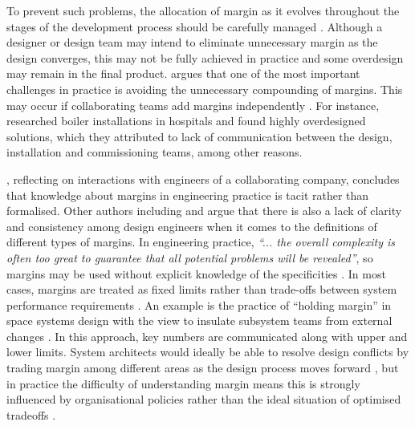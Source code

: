 To prevent such problems, the allocation of margin as it evolves throughout the stages of the development process should be carefully managed \citep{Thunnissen2004b, Eckert2019}. Although a designer or design team may intend to eliminate unnecessary margin as the design converges, this may not be fully achieved in practice and some overdesign may remain in the final product. \cite{Gale1975} argues that one of the most important challenges in practice is avoiding the unnecessary compounding of margins. This may occur if collaborating teams add margins independently \citep{Gale1975, Eckert2017}. For instance, \cite{Jones2018} researched boiler installations in hospitals and found highly overdesigned solutions, which they attributed to lack of communication between the design, installation and commissioning teams, among other reasons.

\cite{lebjioui2018}, reflecting on interactions with engineers of a collaborating company, concludes that knowledge about margins in engineering practice is tacit rather than formalised. Other authors including \cite{Gale1975} and \cite{Eckert2017} argue that there is also a lack of clarity and consistency among design engineers when it comes to the definitions of different types of margins. In engineering practice, \textit{``... the overall complexity is often too great to guarantee that all potential problems will be revealed''}, so margins may be used without explicit knowledge of the specificities \citep{Eckert2004}. In most cases, margins are treated as fixed limits rather than trade-offs between system performance requirements \citep{Tan2016}. An example is the practice of ``holding margin'' in space systems design with the view to insulate subsystem teams from external changes \citep{Thunnissen2004b}. In this approach, key numbers are communicated along with upper and lower limits. System architects would ideally be able to resolve  design conflicts by trading margin among different areas as the design process moves forward \citep{Guenov2018}, but in practice the difficulty of understanding margin means this is strongly influenced by organisational policies rather than the ideal situation of optimised tradeoffs \citep{Thunnisen2004}.

